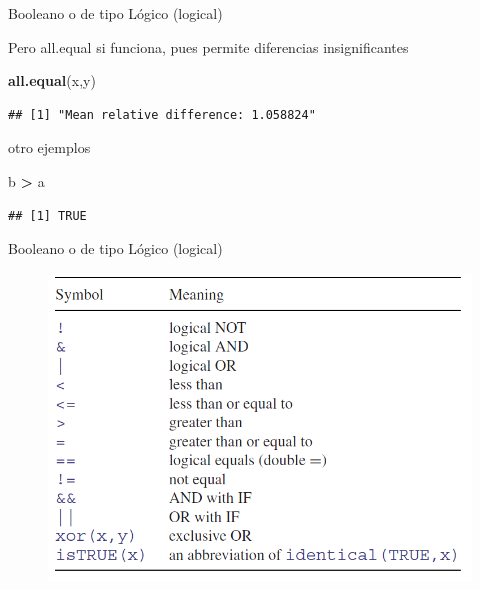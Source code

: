 \documentclass[ignorenonframetext,]{beamer}
\newenvironment{Shaded}{\begin{snugshade}}{\end{snugshade}}
\newcommand{\KeywordTok}[1]{\textcolor[rgb]{0.13,0.29,0.53}{\textbf{#1}}}
\newcommand{\StringTok}[1]{\textcolor[rgb]{0.31,0.60,0.02}{#1}}
\newcommand{\OperatorTok}[1]{\textcolor[rgb]{0.81,0.36,0.00}{\textbf{#1}}}
\newcommand{\NormalTok}[1]{#1}
\begin{document}
\begin{frame}[fragile]{Booleano o de tipo Lógico (logical)}

Pero all.equal si funciona, pues permite diferencias insignificantes

\begin{Shaded}
\begin{Highlighting}[]
\KeywordTok{all.equal}\NormalTok{(x,y)}
\end{Highlighting}
\end{Shaded}

\begin{verbatim}
## [1] "Mean relative difference: 1.058824"
\end{verbatim}

otro ejemplos

\begin{Shaded}
\begin{Highlighting}[]
\NormalTok{b }\OperatorTok{>}\StringTok{ }\NormalTok{a}
\end{Highlighting}
\end{Shaded}

\begin{verbatim}
## [1] TRUE
\end{verbatim}

\end{frame}

\begin{frame}{Booleano o de tipo Lógico (logical)}

\begin{center}
\begin{figure}
\includegraphics[scale=0.5]{logical.png}
\end{figure}
\end{center}


\end{frame}
\end{document}
